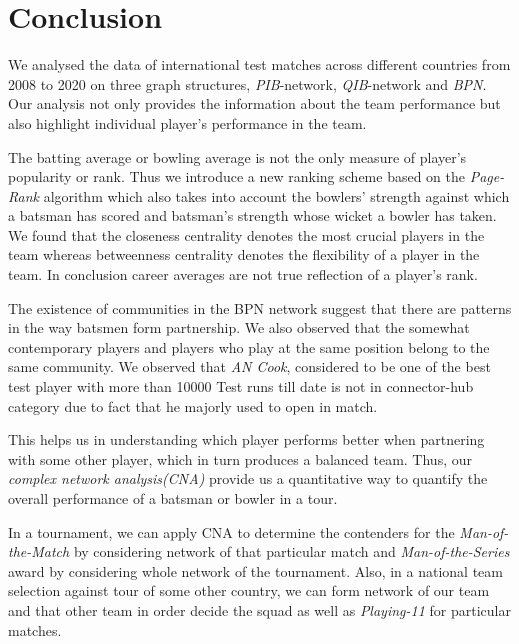 \documentclass{article}
\begin{document}
\begin{table}[!h]
\end{table}

\section{Conclusion}
We analysed the data of international test matches across different countries from 2008 to 2020 on three graph structures, \textit{PIB}-network, \textit{QIB}-network and \textit{BPN}. Our analysis not only provides the information about the team performance but also highlight individual player's performance in the team.

The batting average or bowling average is not the only measure of player's popularity or rank. Thus we introduce a new ranking scheme based on the \textit{Page-Rank} algorithm which also takes into account the bowlers' strength against which a batsman has scored and batsman's strength whose wicket a bowler has taken. We found that the closeness centrality denotes the most crucial players in the team whereas betweenness centrality denotes the flexibility of a player in the team. In conclusion career averages are not true reflection of a player's rank.

The existence of communities in the BPN network suggest that there are patterns in the way batsmen form partnership. We also observed that the somewhat contemporary players and players who play at the same position belong to the same community. We observed that \textit{AN Cook}, considered to be one of the best test player with more than 10000 Test runs till date is not in connector-hub category due to fact that he majorly used to open in match. 

This helps us in understanding which player performs better when partnering with some other player, which in turn produces a balanced team. Thus, our \textit{complex network analysis(CNA)} provide us a quantitative way to quantify the overall performance of a batsman or bowler in a tour. 

In a tournament, we can apply CNA to determine the contenders for the \textit{Man-of-the-Match} by considering network of that particular match and \textit{Man-of-the-Series} award by considering whole network of the tournament. 
Also, in a national team selection against tour of some other country, we can form network of our team and that other team in order decide the squad as well as \textit{Playing-11} for particular matches. \cite{SM2013} \cite{SM2104} 

\printbibliography
\end{document}
